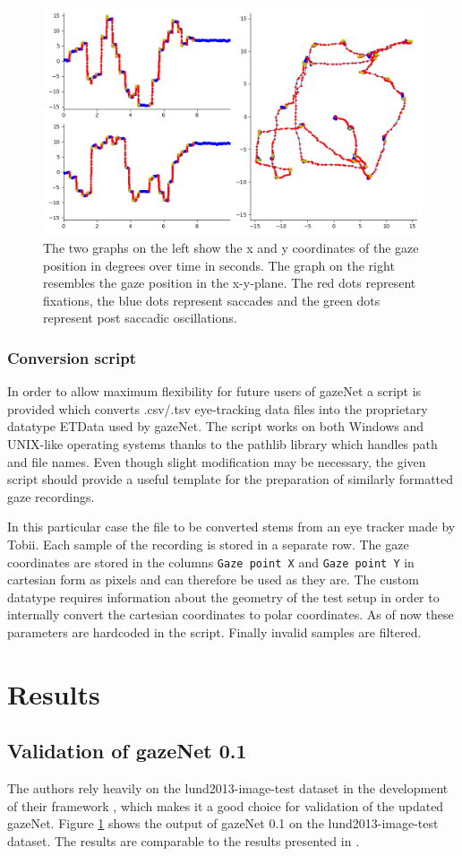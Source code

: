 \documentclass[acmlarge]{acmart}
\begin{document}
\begin{figure}
    \caption{The two graphs on the left show the x and y coordinates of the gaze position in degrees over time in seconds. The graph on the right resembles the gaze position in the x-y-plane. The red dots represent fixations, the blue dots represent saccades and the green dots represent post saccadic oscillations.}
    \label{fig:lund2013}
    \includegraphics[width=0.6\linewidth]{TH34_img_Europe_labelled_MN}
\end{figure}


\subsubsection{Conversion script}
In order to allow maximum flexibility for future users of gazeNet a script is provided which converts .csv/.tsv eye-tracking data files into the proprietary datatype ETData used by gazeNet. The script works on both Windows and UNIX-like operating systems thanks to the pathlib library which handles path and file names. Even though slight modification may be necessary, the given script should provide a useful template for the preparation of similarly formatted gaze recordings. %

In this particular case the file to be converted stems from an eye tracker made by Tobii. Each sample of the recording is stored in a separate row. The gaze coordinates are stored in the columns \verb|Gaze point X| and \verb|Gaze point Y| in cartesian form as pixels and can therefore be used as they are. The custom datatype requires information about the geometry of the test setup in order to internally convert the cartesian coordinates to polar coordinates. As of now these parameters are hardcoded in the script. Finally invalid samples are filtered.

\section{Results}
\subsection{Validation of gazeNet 0.1}
The authors rely heavily on the lund2013-image-test dataset in the development of their framework \cite{zemblys2018gazeNet}, which makes it a good choice for validation of the updated gazeNet. Figure \ref{fig:lund2013} shows the output of gazeNet 0.1 on the lund2013-image-test dataset. The results are comparable to the results presented in \cite{zemblys2018gazeNet}.
\end{document}

